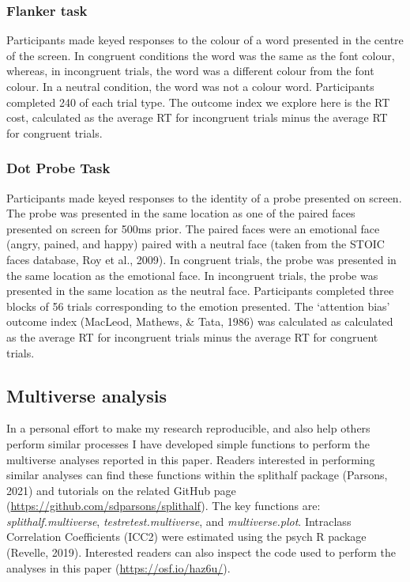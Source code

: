 \documentclass[
  english,
  man,floatsintext]{apa6}
\begin{document}
\hypertarget{flanker-task}{%
\subsubsection{Flanker task}\label{flanker-task}}

Participants made keyed responses to the colour of a word presented in the centre of the screen. In congruent conditions the word was the same as the font colour, whereas, in incongruent trials, the word was a different colour from the font colour. In a neutral condition, the word was not a colour word. Participants completed 240 of each trial type. The outcome index we explore here is the RT cost, calculated as the average RT for incongruent trials minus the average RT for congruent trials.

\hypertarget{dot-probe-task}{%
\subsubsection{Dot Probe Task}\label{dot-probe-task}}

Participants made keyed responses to the identity of a probe presented on screen. The probe was presented in the same location as one of the paired faces presented on screen for 500ms prior. The paired faces were an emotional face (angry, pained, and happy) paired with a neutral face (taken from the STOIC faces database, Roy et al., 2009). In congruent trials, the probe was presented in the same location as the emotional face. In incongruent trials, the probe was presented in the same location as the neutral face. Participants completed three blocks of 56 trials corresponding to the emotion presented. The `attention bias' outcome index (MacLeod, Mathews, \& Tata, 1986) was calculated as calculated as the average RT for incongruent trials minus the average RT for congruent trials.

\hypertarget{multiverse-analysis}{%
\subsection{Multiverse analysis}\label{multiverse-analysis}}

In a personal effort to make my research reproducible, and also help others perform similar processes I have developed simple functions to perform the multiverse analyses reported in this paper. Readers interested in performing similar analyses can find these functions within the splithalf package (Parsons, 2021) and tutorials on the related GitHub page (\url{https://github.com/sdparsons/splithalf}). The key functions are: \emph{splithalf.multiverse}, \emph{testretest.multiverse}, and \emph{multiverse.plot}. Intraclass Correlation Coefficients (ICC2) were estimated using the psych R package (Revelle, 2019). Interested readers can also inspect the code used to perform the analyses in this paper (\url{https://osf.io/haz6u/}).
\end{document}
